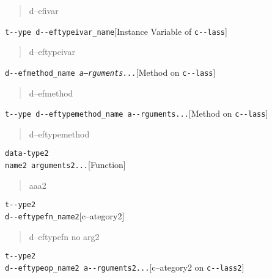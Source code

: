 \documentclass{book}
\begin{document}
\begin{titlepage}
%
\begin{quote}
\unskip{\parskip=0pt\noindent}%
d--efivar
\end{quote}

\noindent\texttt{t{-}{-}ype d{-}{-}eftypeivar\_name}\hfill[Instance Variable of \texttt{c{-}{-}lass}]

%
\begin{quote}
\unskip{\parskip=0pt\noindent}%
d--eftypeivar
\end{quote}

\noindent\texttt{d{-}{-}efmethod\_name \EmbracOn{}\textnormal{\textsl{a--rguments...}}\EmbracOff{}}\hfill[Method on \texttt{c{-}{-}lass}]

%
\begin{quote}
\unskip{\parskip=0pt\noindent}%
d--efmethod
\end{quote}

\noindent\texttt{t{-}{-}ype d{-}{-}eftypemethod\_name a{-}{-}rguments...}\hfill[Method on \texttt{c{-}{-}lass}]

%
\begin{quote}
\unskip{\parskip=0pt\noindent}%
d--eftypemethod
\end{quote}


\noindent\texttt{data-type2\leavevmode{}\\name2 arguments2...}\hfill[Function]

%
\begin{quote}
\unskip{\parskip=0pt\noindent}%
aaa2
\end{quote}

\noindent\texttt{t{-}{-}ype2\leavevmode{}\\d{-}{-}eftypefn\_name2}\hfill[c--ategory2]

%
\begin{quote}
\unskip{\parskip=0pt\noindent}%
d--eftypefn no arg2
\end{quote}

\noindent\texttt{t{-}{-}ype2\leavevmode{}\\d{-}{-}eftypeop\_name2 a{-}{-}rguments2...}\hfill[c--ategory2 on \texttt{c{-}{-}lass2}]


\end{titlepage}
\end{document}
